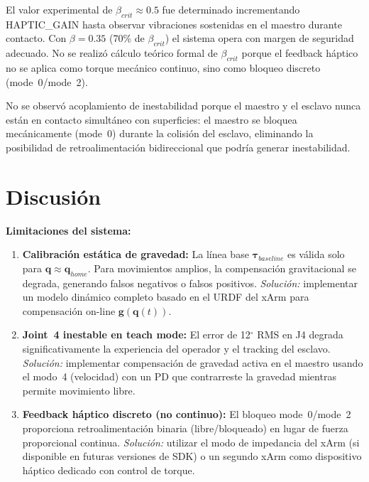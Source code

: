 \documentclass[journal,10pt,twoside]{IEEEtran}
\begin{document}
El valor experimental de $\beta_{crit}\approx0{.}5$ fue
determinado incrementando HAPTIC\_GAIN hasta observar vibraciones
sostenidas en el maestro durante contacto. Con $\beta=0{.}35$ (70\%
de $\beta_{crit}$) el sistema opera con margen de seguridad adecuado.
No se realizó cálculo teórico formal de $\beta_{crit}$ porque el
feedback háptico no se aplica como torque mecánico continuo, sino
como bloqueo discreto (mode~0/mode~2).

No se observó acoplamiento de inestabilidad porque el
maestro y el esclavo nunca están en contacto simultáneo con superficies:
el maestro se bloquea mecánicamente (mode~0) durante la colisión del
esclavo, eliminando la posibilidad de retroalimentación bidireccional
que podría generar inestabilidad.

\section{Discusión}
\label{sec:discussion}


\textbf{Limitaciones del sistema:}

\begin{enumerate}
  \item \textbf{Calibración estática de gravedad:} La línea base
        $\bm{\tau}_{baseline}$ es válida solo para $\bm{q}\approx\bm{q}_{home}$.
        Para movimientos amplios, la compensación gravitacional se
        degrada, generando falsos negativos o falsos positivos.
        \textit{Solución:} implementar un modelo dinámico completo
        basado en el URDF del xArm para compensación on-line
        $\bm{g}(\bm{q}(t))$.

  \item \textbf{Joint~4 inestable en teach mode:}
        El error de 12$^\circ$ RMS en J4 degrada significativamente
        la experiencia del operador y el tracking del esclavo.
        \textit{Solución:} implementar compensación de gravedad activa
        en el maestro usando el modo~4 (velocidad) con un PD que
        contrarreste la gravedad mientras permite movimiento libre.

  \item \textbf{Feedback háptico discreto (no continuo):}
        El bloqueo mode~0/mode~2 proporciona retroalimentación binaria
        (libre/bloqueado) en lugar de fuerza proporcional continua.
        \textit{Solución:} utilizar el modo de impedancia del xArm
        (si disponible en futuras versiones de SDK) o un segundo
        xArm como dispositivo háptico dedicado con control de torque.
\end{enumerate}
\end{document}
